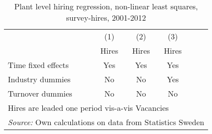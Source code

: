 \begin{table}[htbp]\centering
\def\sym#1{\ifmmode^{#1}\else\(^{#1}\)\fi}
\caption{Plant level hiring regression, non-linear least squares, survey-hires, 2001-2012}
\begin{tabular}{l*{5}{c}}
\hline\hline
                &\multicolumn{1}{c}{(1)}&\multicolumn{1}{c}{(2)}&\multicolumn{1}{c}{(3)}\\
                &\multicolumn{1}{c}{Hires}&\multicolumn{1}{c}{Hires}&\multicolumn{1}{c}{Hires}\\
\hline


\hline 
Time fixed effects  &         Yes         &         Yes         &         Yes         &                     \\
[1em]
Industry dummies    &          No         &          No         &         Yes         &                      \\
[1em]
Turnover dummies    &          No         &          No         &          No         &                      \\
\hline 


\hline\hline
\multicolumn{6}{l}{\footnotesize Hires are leaded one period vis-a-vis Vacancies}\\
\multicolumn{6}{l}{\footnotesize \emph{Source:} Own calculations on data from Statistics Sweden}\\
\end{tabular}
\end{table}

